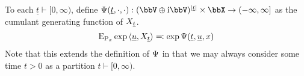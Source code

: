 \begin{definition}
  \label{definition:aff-fdds}
  To each $\underline t \vdash [0,\infty)$, define $\aff(\underline t, \cdot, \cdot): (\vecSpace \oplus \im\vecSpace)^{|\underline t|} \times \stateSpace \rightarrow (-\infty,\infty]$ as the cumulant generating function of $X_{\underline t}$.
  \begin{equation*}
    {\operatorname{E}}_{{\operatorname{P}}_x} \exp{\langle \underline{u}, X_{\underline t} \rangle} \eqqcolon \exp\Psi(\underline t, \underline{u}, x)
  \end{equation*}
  Note that this extends the definition of $\Psi$ in that we may always consider some time $t > 0$ as a partition $t \vdash [0,\infty)$.
\end{definition}
